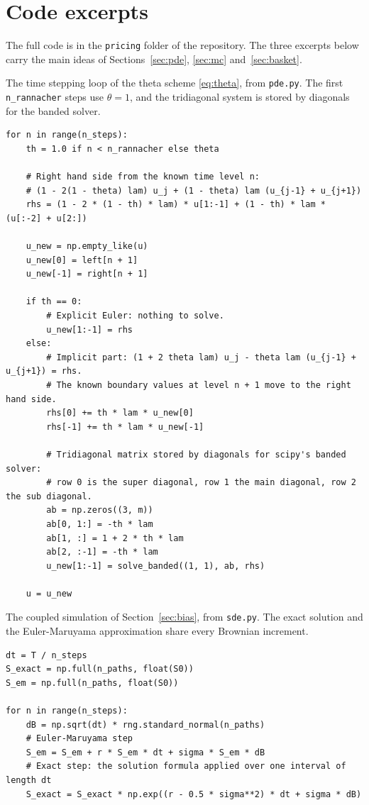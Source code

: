 \documentclass[11pt,a4paper]{article}
\begin{document}
\appendix

\section{Code excerpts}\label{app:code}

The full code is in the \texttt{pricing} folder of the repository. The three excerpts below carry the main ideas of Sections~\ref{sec:pde}, \ref{sec:mc} and~\ref{sec:basket}.

The time stepping loop of the theta scheme \eqref{eq:theta}, from \texttt{pde.py}. The first \texttt{n\_rannacher} steps use $\theta = 1$, and the tridiagonal system is stored by diagonals for the banded solver.

\begin{lstlisting}
for n in range(n_steps):
    th = 1.0 if n < n_rannacher else theta

    # Right hand side from the known time level n:
    # (1 - 2(1 - theta) lam) u_j + (1 - theta) lam (u_{j-1} + u_{j+1})
    rhs = (1 - 2 * (1 - th) * lam) * u[1:-1] + (1 - th) * lam * (u[:-2] + u[2:])

    u_new = np.empty_like(u)
    u_new[0] = left[n + 1]
    u_new[-1] = right[n + 1]

    if th == 0:
        # Explicit Euler: nothing to solve.
        u_new[1:-1] = rhs
    else:
        # Implicit part: (1 + 2 theta lam) u_j - theta lam (u_{j-1} + u_{j+1}) = rhs.
        # The known boundary values at level n + 1 move to the right hand side.
        rhs[0] += th * lam * u_new[0]
        rhs[-1] += th * lam * u_new[-1]

        # Tridiagonal matrix stored by diagonals for scipy's banded solver:
        # row 0 is the super diagonal, row 1 the main diagonal, row 2 the sub diagonal.
        ab = np.zeros((3, m))
        ab[0, 1:] = -th * lam
        ab[1, :] = 1 + 2 * th * lam
        ab[2, :-1] = -th * lam
        u_new[1:-1] = solve_banded((1, 1), ab, rhs)

    u = u_new
\end{lstlisting}

The coupled simulation of Section~\ref{sec:bias}, from \texttt{sde.py}. The exact solution and the Euler-Maruyama approximation share every Brownian increment.

\begin{lstlisting}
dt = T / n_steps
S_exact = np.full(n_paths, float(S0))
S_em = np.full(n_paths, float(S0))

for n in range(n_steps):
    dB = np.sqrt(dt) * rng.standard_normal(n_paths)
    # Euler-Maruyama step
    S_em = S_em + r * S_em * dt + sigma * S_em * dB
    # Exact step: the solution formula applied over one interval of length dt
    S_exact = S_exact * np.exp((r - 0.5 * sigma**2) * dt + sigma * dB)
\end{lstlisting}
\end{document}
